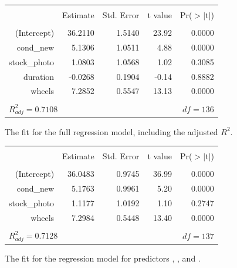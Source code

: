 \begin{figure}[ht]
\centering
\begin{tabular}{rrrrr}
  \hline
  \vspace{-3.7mm} & & & & \\
 & Estimate & Std. Error & t value & Pr($>$$|$t$|$) \\ 
  \hline
  \vspace{-3.8mm} & & & & \\
(Intercept) & 36.2110 & 1.5140 & 23.92 & 0.0000 \\ 
  cond\_\hspace{0.3mm}new & 5.1306 & 1.0511 & 4.88 & 0.0000 \\ 
  stock\_\hspace{0.3mm}photo & 1.0803 & 1.0568 & 1.02 & 0.3085 \\ 
  duration & -0.0268 & 0.1904 & -0.14 & 0.8882 \\ 
  wheels & 7.2852 & 0.5547 & 13.13 & 0.0000 \\ 
   \hline
  \vspace{-3.6mm} & & & & \\
\multicolumn{3}{l}{$R_{adj}^2 = 0.7108$}&\multicolumn{2}{r}{$df=136$}
\end{tabular}
\caption{The fit for the full regression model, including the adjusted $R^2$.}
\label{outputForMultipleRegrOutputForAllPredictors2}
\end{figure}

\begin{figure}[ht]
\centering
\begin{tabular}{rrrrr}
  \hline
  \vspace{-3.7mm} & & & & \\
 & Estimate & Std. Error & t value & Pr($>$$|$t$|$) \\ 
  \hline
  \vspace{-3.8mm} & & & & \\
(Intercept) & 36.0483 & 0.9745 & 36.99 & 0.0000 \\ 
  cond\_\hspace{0.3mm}new & 5.1763 & 0.9961 & 5.20 & 0.0000 \\ 
  stock\_\hspace{0.3mm}photo & 1.1177 & 1.0192 & 1.10 & 0.2747 \\ 
  wheels & 7.2984 & 0.5448 & 13.40 & 0.0000 \\ 
   \hline
  \vspace{-3.6mm} & & & & \\
\multicolumn{3}{l}{$R_{adj}^2 = 0.7128$}&\multicolumn{2}{r}{$df=137$}
\end{tabular}
\caption{The fit for the regression model for predictors , , and .}
\label{marioKartMultipleRegressionModelAllButDuration}
\end{figure}

